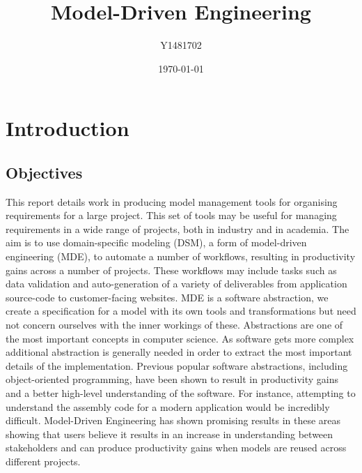 \documentclass{article}
\title{Model-Driven Engineering}
\author{Y1481702}
\date{\today}
\begin{document}
\begin{titlepage}
\maketitle
\tableofcontents
\end{titlepage}




\section{Introduction}
\subsection{Objectives}
This report details work in producing model management tools for organising requirements for a large project. This set of tools may be useful for managing requirements in a wide range of projects, both in industry and in academia. The aim is to use domain-specific modeling (DSM), a form of model-driven engineering (MDE), to automate a number of workflows, resulting in productivity gains across a number of projects. These workflows may include tasks such as data validation and auto-generation of a variety of deliverables from application source-code to customer-facing websites. MDE is a software abstraction, we create a specification for a model with its own tools and transformations but need not concern ourselves with the inner workings of these. Abstractions are one of the most important concepts in computer science. As software gets more complex additional abstraction is generally needed in order to extract the most important details of the implementation\cite[p.~24]{csapp}. Previous popular software abstractions, including object-oriented programming, have been shown to result in productivity gains and a better high-level understanding of the software. For instance, attempting to understand the assembly code for a modern application would be incredibly difficult. Model-Driven Engineering has shown promising results in these areas showing that users believe it results in an increase in understanding between stakeholders and can produce productivity gains when models are reused across different projects\cite{industry_review}.
\end{document}
